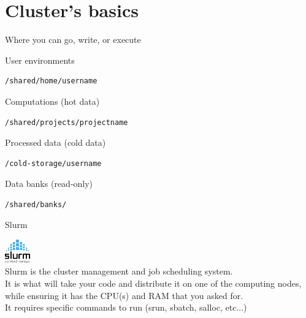 \documentclass{beamer}
\begin{document}
\section{Cluster's basics}
\begin{frame}[fragile]{Where you can go, write, or execute}
\begin{block}{User environments}
\begin{verbatim}
/shared/home/username
\end{verbatim}
\end{block}

\begin{block}{Computations (hot data)}
\begin{verbatim}
/shared/projects/projectname
\end{verbatim}
\end{block}

\begin{block}{Processed data (cold data)}
\begin{verbatim}
/cold-storage/username
\end{verbatim}
\end{block}

\begin{block}{Data banks (read-only)}
\begin{verbatim}
/shared/banks/
\end{verbatim}
\end{block}
\end{frame}

\begin{frame}[fragile]{Slurm}

\includegraphics[height = 1cm]{Logo/Slurm.png} \\
Slurm is the cluster management and job scheduling system.\\

It is what will take your code and distribute it on one of the computing nodes, while ensuring it has the CPU(s) and RAM that you asked for.
\\

It requires specific commands to run (srun, sbatch, salloc, etc...)
\end{frame}
\end{document}
